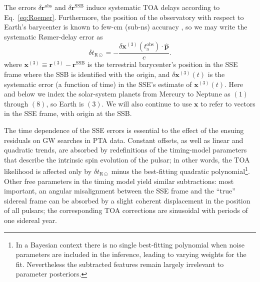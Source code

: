 \documentclass[iop,apj,twocolappendix]{emulateapj}
\begin{document}
The errors $\delta \mathbf{r}^\mathrm{obs}$ and $\delta \mathbf{r}^\mathrm{SSB}$ induce systematic TOA delays according to Eq.\ \eqref{eq:Roemer}.
Furthermore, the position of the observatory with respect to Earth's barycenter is known to few-cm (sub-ns) accuracy \citep{ehm06}, so we may write the systematic R{\o}mer-delay error as
%
\begin{equation}
\label{eq:deltar}
\delta t_{\mathrm{R}\odot} = -\frac{\delta \mathbf{x}^{(3)}(t_\mathrm{a}^\mathrm{obs})\cdot\hat{\mathbf{p}}}{c}.
\end{equation}
%
where $\mathbf{x}^{(3)} \equiv \mathbf{r}^{(3)} - \mathbf{r}^\mathrm{SSB}$
is the terrestrial barycenter's position in the SSE frame where the SSB is identified with the origin, and $\delta \mathbf{x}^{(3)}(t)$ is the systematic error (a function of time) in the SSE's estimate of $\mathbf{x}^{(3)}(t)$. Here and below we index the solar-system planets from Mercury to Neptune as $(1)$ through $(8)$, so Earth is $(3)$. We will also continue to use $\mathbf{x}$ to refer to vectors in the SSE frame, with origin at the SSB.

The time dependence of the SSE errors is essential to the effect of the ensuing residuals on GW searches in PTA data. Constant offsets, as well as linear and quadratic trends, are absorbed by redefinitions of the timing-model parameters that describe the intrinsic spin evolution of the pulsar; in other words, the TOA likelihood is affected only by $\delta t_{\mathrm{R}\odot}$ minus the best-fitting quadratic polynomial\footnote{In a Bayesian context there is no single best-fitting polynomial when noise parameters are included in the inference, leading to varying weights for the fit. Nevertheless the subtracted features remain largely irrelevant to parameter posteriors.}. Other free parameters in the timing model yield similar subtractions: most important, an angular misalignment between the SSE frame and the ``true'' sidereal frame can be absorbed by a slight coherent displacement in the position of all pulsars; the corresponding TOA corrections are sinusoidal with periods of one sidereal year.
\end{document}
